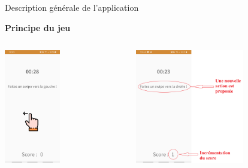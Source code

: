 \documentclass[xcolor=dvipsnames]{beamer}
\begin{document}
\begin{frame}{Description générale de l'application}
    \begin{center}
        \textbf{\LARGE{Principe du jeu}}
    \end{center}
    \begin{center}
        \begin{columns}[T]
    \begin{column}[c]{5cm}
        \begin{center}\includegraphics[height=5cm]{Images/game_swipe.png}
        \end{center}
    \end{column}
    \begin{column}[c]{5cm}
        \begin{center}\includegraphics[height=5cm]{Images/legende_jeu.png}
        \end{center}
    \end{column}
    \end{columns}
    \end{center}
\end{frame}
\end{document}

